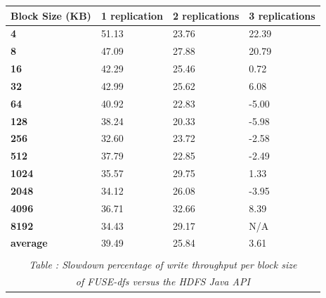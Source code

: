 \documentclass[11]{article}
\begin{document}
\begin{center}
\begin{tabular}[tbp]{| l | l | l | l |}

\hline
\textbf{Block Size (KB)}& \textbf{1 replication} & \textbf{2 replications} &\textbf{3 replications}	\\
\hline
\hline
\textbf{4}	&	51.13	&	23.76	&	22.39\\
\textbf{8}	&	47.09	&	27.88	&	20.79\\
\textbf{16}	&	42.29	&	25.46	&	0.72\\
\textbf{32}	&	42.99	&	25.62	&	6.08\\
\textbf{64}	&	40.92	&	22.83	&	-5.00\\
\textbf{128}	&	38.24	&	20.33	&	-5.98\\
\textbf{256}	&	32.60	&	23.72	&	-2.58\\
\textbf{512}	&	37.79	&	22.85	&	-2.49\\
\textbf{1024}	&	35.57	&	29.75	&	1.33\\
\textbf{2048}	&	34.12	&	26.08	&	-3.95\\
\textbf{4096}	&	36.71	&	32.66	&	8.39\\
\textbf{8192}	&	34.43	&	29.17	&	N/A\\
\hline
\hline
\textbf{average} &	39.49	&	25.84	&	3.61\\
\hline
\multicolumn{4}{c}{\hfill}\\
\multicolumn{4}{c}{\emph{Table : Slowdown percentage of \textit{write} throughput per block size }}\\
\multicolumn{4}{c}{\emph{of FUSE-dfs versus the HDFS Java API}}\\
\end{tabular}
\end{center}
\end{document}
